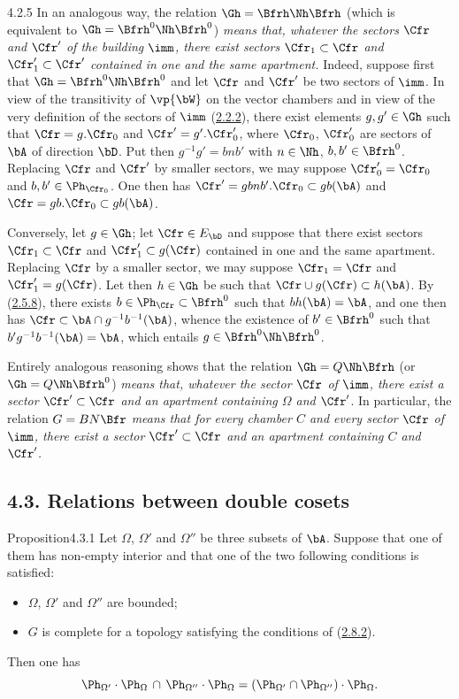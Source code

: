 \documentclass[12pt,a4paper,oneside,english]{smfart}
\makeatletter
\newcommand{\btanchor}[1]{\leavevmode\Hy@raisedlink{\hypertarget{bt:#1}{}}}
\newcommand{\btref}[1]{\hyperlink{bt:#1}{#1}}
\newcommand{\btsecB}[2]{%
  \par\needspace{4\baselineskip}\phantomsection
  \subsection*{#2}%
  \ifx\relax#1\relax\else\btanchor{#1}\fi}
\theoremstyle{definition}
\theoremstyle{bt}
\makeatother
\begin{document}
\num{4.2.5}\btanchor{4.2.5}
In an analogous way, the relation $\Gh = \Bfrh\Nh\Bfrh$ (which is equivalent
to $\Gh = \Bfrh^{0}\Nh\Bfrh^{0}$) \emph{means that, whatever the sectors
$\Cfr$ and $\Cfr'$ of the building $\imm$, there exist sectors
$\Cfr_1\subset\Cfr$ and $\Cfr'_1\subset\Cfr'$ contained in one and the same
apartment.} Indeed, suppose first that $\Gh = \Bfrh^{0}\Nh\Bfrh^{0}$ and let
$\Cfr$ and $\Cfr'$ be two sectors of $\imm$. In view of the transitivity of
$\vp{\bW}$ on the vector chambers and in view of the very definition of the
sectors of $\imm$ (\btref{2.2.2}), there exist elements $g, g'\in\Gh$ such that
$\Cfr = g.\Cfr_0$ and $\Cfr' = g'.\Cfr'_0$, where $\Cfr_0$, $\Cfr'_0$ are
sectors of $\bA$ of direction $\bD$. Put then $g^{-1}g' = bnb'$ with
$n\in\Nh$, $b, b'\in\Bfrh^{0}$. Replacing $\Cfr$ and $\Cfr'$ by smaller
sectors, we may suppose $\Cfr'_0 = \Cfr_0$ and $b, b'\in\Ph_{\Cfr_0}$. One
then has $\Cfr' = gbnb'.\Cfr_0 \subset gb(\bA)$ and
$\Cfr = gb.\Cfr_0\subset gb(\bA)$.

Conversely, let $g\in\Gh$; let $\Cfr\in E_{\bD}$ and suppose that there exist
sectors $\Cfr_1\subset\Cfr$ and $\Cfr'_1\subset g(\Cfr)$ contained in one and
the same apartment. Replacing $\Cfr$ by a smaller sector, we may suppose
$\Cfr_1 = \Cfr$ and $\Cfr'_1 = g(\Cfr)$. Let then $h\in\Gh$ be such that
$\Cfr\cup g(\Cfr)\subset h(\bA)$. By (\btref{2.5.8}), there exists
$b\in\Ph_{\Cfr}\subset\Bfrh^{0}$ such that $bh(\bA) = \bA$, and one then has
$\Cfr \subset \bA\cap g^{-1}b^{-1}(\bA)$, whence the existence of
$b'\in\Bfrh^{0}$ such that $b'g^{-1}b^{-1}(\bA) = \bA$, which entails
$g \in \Bfrh^{0}\Nh\Bfrh^{0}$.

Entirely analogous reasoning shows that the relation $\Gh = Q\Nh\Bfrh$ (or
$\Gh = Q\Nh\Bfrh^{0}$) \emph{means that, whatever the sector $\Cfr$ of
$\imm$, there exist a sector $\Cfr'\subset\Cfr$ and an apartment containing
$\Omega$ and $\Cfr'$}. In particular, the relation $G = BN\Bfr$ \emph{means
that for every chamber $C$ and every sector $\Cfr$ of $\imm$, there exist a
sector $\Cfr'\subset\Cfr$ and an apartment containing $C$ and $\Cfr'$.}

\btsecB{4.3}{4.3. Relations between double cosets}

\begin{state}{Proposition}{4.3.1}\btanchor{4.3.1}
Let $\Omega$, $\Omega'$ and $\Omega''$ be three subsets of $\bA$. Suppose
that one of them has non-empty interior and that one of the two following
conditions is satisfied:
\begin{itemize}
\item[a)] $\Omega$, $\Omega'$ and $\Omega''$ are bounded;
\item[b)] $G$ is complete for a topology satisfying the conditions of
(\btref{2.8.2}).
\end{itemize}
Then one has
\[
\Ph_{\Omega'}\cdot\Ph_{\Omega} \,\cap\, \Ph_{\Omega''}\cdot\Ph_{\Omega}
= (\Ph_{\Omega'}\cap\Ph_{\Omega''})\cdot\Ph_{\Omega}.
\]
\end{state}
\end{document}

